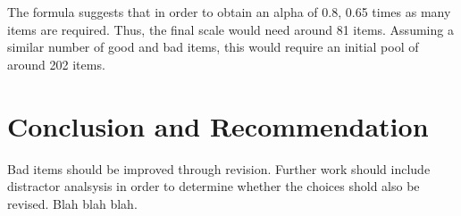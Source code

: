 \documentclass[10pt,man]{apa6}\usepackage{graphicx, color}
\begin{document}
The formula suggests  that in order to obtain
an alpha of 0.8,
0.65 times as many items are required.
Thus, the final scale would need around
81 items.
Assuming a similar number of good and bad items,
this would require an initial pool of around
202 items.  

\section{Conclusion and Recommendation}
Bad items should be improved through revision. Further work should include distractor analsysis in order to determine whether the choices shold also be revised. Blah blah blah.

\printbibliography

\appendix
\end{document}
